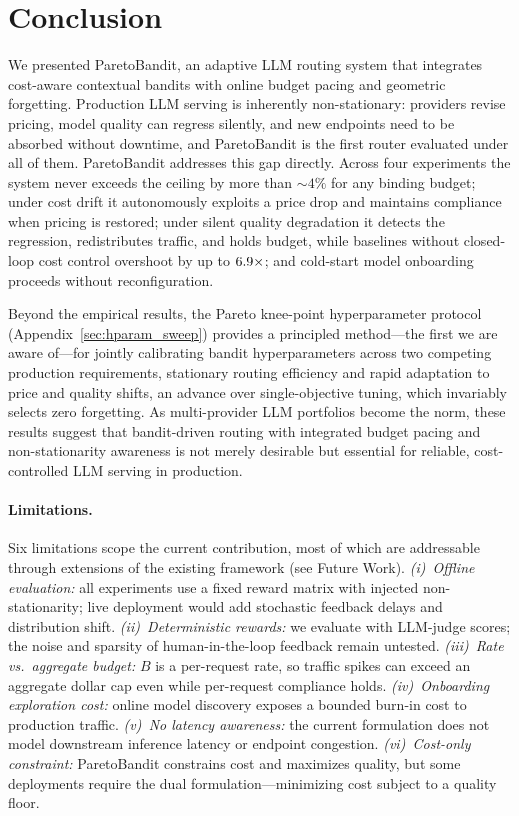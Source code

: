 \section{Conclusion}
\label{sec:conclusion}

We presented ParetoBandit, an adaptive LLM routing system that integrates cost-aware contextual bandits with online budget pacing and geometric forgetting.
Production LLM serving is inherently non-stationary: providers revise pricing, model quality can regress silently, and new endpoints need to be absorbed without downtime, and ParetoBandit is the first router evaluated under all of them.
ParetoBandit addresses this gap directly.
Across four experiments the system never exceeds the ceiling by more than ${\sim}4\%$ for any binding budget; under cost drift it autonomously exploits a price drop and maintains compliance when pricing is restored; under silent quality degradation it detects the regression, redistributes traffic, and holds budget, while baselines without closed-loop cost control overshoot by up to $6.9{\times}$; and cold-start model onboarding proceeds without reconfiguration.

Beyond the empirical results, the Pareto knee-point hyperparameter protocol (Appendix~\ref{sec:hparam_sweep}) provides a principled method---the first we are aware of---for jointly calibrating bandit hyperparameters across two competing production requirements, stationary routing efficiency and rapid adaptation to price and quality shifts, an advance over single-objective tuning, which invariably selects zero forgetting.
As multi-provider LLM portfolios become the norm, these results suggest that bandit-driven routing with integrated budget pacing and non-stationarity awareness is not merely desirable but essential for reliable, cost-controlled LLM serving in production.

\paragraph{Limitations.}
Six limitations scope the current contribution, most of which are addressable through extensions of the existing framework (see Future Work).
\emph{(i)~Offline evaluation:} all experiments use a fixed reward matrix with injected non-stationarity; live deployment would add stochastic feedback delays and distribution shift.
\emph{(ii)~Deterministic rewards:} we evaluate with LLM-judge scores; the noise and sparsity of human-in-the-loop feedback remain untested.
\emph{(iii)~Rate vs.\ aggregate budget:} $B$ is a per-request rate, so traffic spikes can exceed an aggregate dollar cap even while per-request compliance holds.
\emph{(iv)~Onboarding exploration cost:} online model discovery exposes a bounded burn-in cost to production traffic.
\emph{(v)~No latency awareness:} the current formulation does not model downstream inference latency or endpoint congestion.
\emph{(vi)~Cost-only constraint:} ParetoBandit constrains cost and maximizes quality, but some deployments require the dual formulation---minimizing cost subject to a quality floor.

